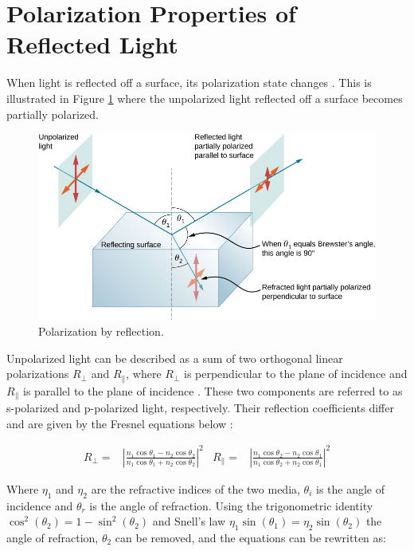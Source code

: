 \section{Polarization Properties of Reflected Light}
When light is reflected off a surface, its polarization state changes \cite[34]{lingUniversityPhysicsVolume2016}.
This is illustrated in Figure \ref{fig:polarized_reflection} where the unpolarized light reflected off a surface becomes partially polarized.


\begin{figure}[H]
    \centering
    \includegraphics[width=.8\linewidth]{figures/polarization/reflaction.png}
    \caption{Polarization by reflection.
        \cite[Figure 1.38]{lingUniversityPhysicsVolume2016}}
    \label{fig:polarized_reflection}
\end{figure}


Unpolarized light can be described as a sum of two orthogonal linear polarizations $R_\perp$ and $R_\parallel$, where $R_\perp$ is perpendicular to the plane of incidence and $R_\parallel$ is parallel to the plane of incidence  \cite{FresnelEquations2024}.
These two components are referred to as s-polarized and p-polarized light, respectively.
Their reflection coefficients differ and are given by the Fresnel equations below \cite{FresnelEquations2024}:

\begin{align}
    R_\perp =         & \left|{\frac {n_{1}\cos \theta _1-n_{2}\cos \theta _2}{n_{1}\cos \theta _1+n_{2}\cos \theta _2}}\right|^{2}
                      &
    R_\parallel     = & \left|{\frac {n_{1}\cos \theta _2-n_{2}\cos \theta _1}{n_{1}\cos \theta _2+n_{2}\cos \theta _1}}\right|^{2}
\end{align}

Where  $\eta_1$ and $\eta_2$ are the refractive indices of the two media,
$\theta_i$ is the angle of incidence and $\theta_r$ is the angle of refraction.
Using the trigonometric identity $ \cos^2{\left(\theta_2 \right)} = 1- \sin^2{\left(\theta_2 \right)}$ and Snell's law $\eta_1 \sin{\left(\theta_1 \right)} = \eta_2 \sin{\left(\theta_2 \right)}$ the angle of refraction, $\theta_2$ can be removed, and the equations can be rewritten as:

